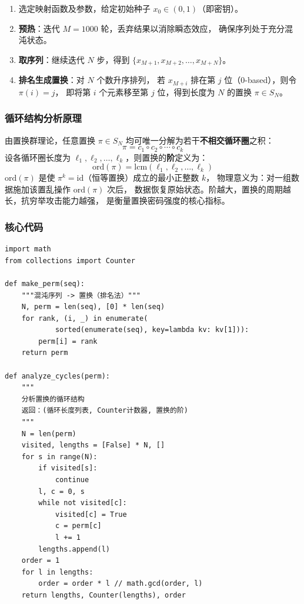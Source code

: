 \documentclass[12pt, a4paper]{article}
\begin{document}
\begin{enumerate}
  \item 选定映射函数及参数，给定初始种子 $x_0\in(0,1)$（即密钥）。
  \item \textbf{预热}：迭代 $M=1000$ 轮，丢弃结果以消除瞬态效应，
        确保序列处于充分混沌状态。
  \item \textbf{取序列}：继续迭代 $N$ 步，得到
        $\{x_{M+1}, x_{M+2}, \ldots, x_{M+N}\}$。
  \item \textbf{排名生成置换}：对 $N$ 个数升序排列，
        若 $x_{M+i}$ 排在第 $j$ 位（0-based），则令 $\pi(i)=j$，
        即将第 $i$ 个元素移至第 $j$ 位，得到长度为 $N$ 的置换 $\pi\in S_N$。
\end{enumerate}

\subsubsection{循环结构分析原理}

由置换群理论，任意置换 $\pi\in S_N$ 均可唯一分解为若干\textbf{不相交循环圈}之积：
\begin{equation}
  \pi = c_1 \circ c_2 \circ \cdots \circ c_k
\end{equation}
设各循环圈长度为 $\ell_1, \ell_2, \ldots, \ell_k$，则置换的\textbf{阶}定义为：
\begin{equation}
  \mathrm{ord}(\pi) = \mathrm{lcm}(\ell_1, \ell_2, \ldots, \ell_k)
\end{equation}
$\mathrm{ord}(\pi)$ 是使 $\pi^k = \mathrm{id}$（恒等置换）成立的最小正整数 $k$，
物理意义为：对一组数据施加该置乱操作 $\mathrm{ord}(\pi)$ 次后，
数据恢复原始状态。阶越大，置换的周期越长，抗穷举攻击能力越强，
是衡量置换密码强度的核心指标。

\subsubsection{核心代码}

\begin{lstlisting}[caption={置乱表生成与循环结构分析核心实现（Python）}]
import math
from collections import Counter

def make_perm(seq):
    """混沌序列 -> 置换（排名法）"""
    N, perm = len(seq), [0] * len(seq)
    for rank, (i, _) in enumerate(
            sorted(enumerate(seq), key=lambda kv: kv[1])):
        perm[i] = rank
    return perm

def analyze_cycles(perm):
    """
    分析置换的循环结构
    返回：(循环长度列表, Counter计数器, 置换的阶)
    """
    N = len(perm)
    visited, lengths = [False] * N, []
    for s in range(N):
        if visited[s]:
            continue
        l, c = 0, s
        while not visited[c]:
            visited[c] = True
            c = perm[c]
            l += 1
        lengths.append(l)
    order = 1
    for l in lengths:
        order = order * l // math.gcd(order, l)
    return lengths, Counter(lengths), order
\end{lstlisting}
\end{document}
